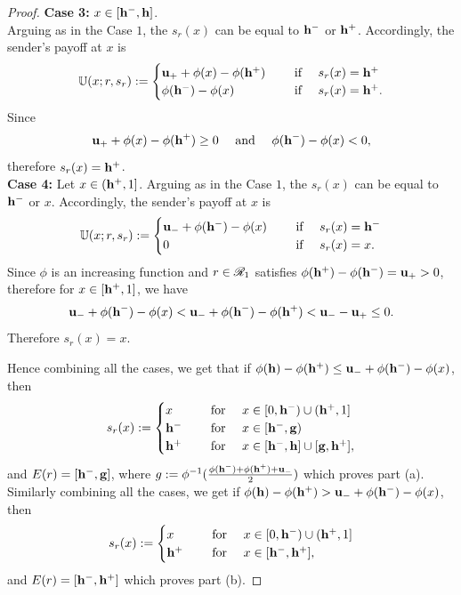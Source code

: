 \begin{proof}
\textbf{Case 3: }
		$x \in [\mathbf{h^{-}},\mathbf{h}]$.\\ Arguing as in the Case $1$, the $s_r(x)$ can be equal to $\mathbf{h^{-}}$ or $\mathbf{h^{+}}$.
		Accordingly, the sender's payoff at $x$ is
		\[\senpayoff(x;r,s_r) := \begin{cases}
			\up + \phi(x) - \phi(\jb)  & \text{ if } s_r(x) = \jb \\
			\phi(\ib) - \phi(x)& \text{ if }s_r(x) = \jb.\\
		\end{cases}\]
 Since $$\up + \phi(x) - \phi(\jb)  \geq 0 \text{ and } \phi(\ib) - \phi(x) <0,$$ therefore $s_r(x) = \mathbf{h^{+}}$. \\


\textbf{Case 4:}
		Let $x \in (\mathbf{h^{+}},1]$. Arguing as in the Case $1$, the $s_r(x)$ can be equal to $\mathbf{h^{-}}$ or $x$. Accordingly, the sender's payoff at $x$ is
			\[\senpayoff(x;r,s_r) := \begin{cases}
			\um + \phi(\ib) - \phi(x) & \text{ if } s_r(x) = \ib \\
			0& \text{ if }s_r(x) = x.\\
		\end{cases}\]
		Since $\phi$ is an increasing function and $r \in \mathscr{R}_1$ satisfies $\phi(\mathbf{h^{+}}) - \phi(\mathbf{h^{-}}) = \mathbf{u_+} > 0$, therefore for $x \in [\mathbf{h^{+}},1]$, we have
		\[\mathbf{u_-} + \phi(\mathbf{h^{-}}) - \phi(x) < \mathbf{u_-} + \phi(\mathbf{h^{-}}) - \phi(\mathbf{h^{+}}) < \mathbf{u_-} -\mathbf{u_+} \leq 0.\]
 		Therefore $s_r(x) = x$.

\noindent Hence combining all the cases, we get that if $\phi(\mathbf{h}) - \phi(\mathbf{h^{+}}) \leq  \mathbf{u_-} + \phi(\mathbf{h^{-}}) - \phi(x)$, then
\begin{equation*}
   s_r(x) := \begin{cases}
       x &\text{ for } x \in [0,\ib) \cup (\jb,1]\\
       \ib &\text{ for } x \in [\ib,\lb)\\
       \jb &\text{ for } x \in [\ib,\h] \cup [\lb,\jb],
   \end{cases}
\end{equation*}
and $E(r) = [\mathbf{h^{-}},\mathbf{g}]$, where $g := \phi^{-1}(\frac{\phi(\mathbf{h^{-}}) + \phi(\mathbf{h^{+}}) + \mathbf{u_-}}{2})$ which proves part (a).\\
\noindent Similarly combining all the cases, we get if $\phi(\mathbf{h}) - \phi(\mathbf{h^{+}}) > \mathbf{u_-} + \phi(\mathbf{h^{-}}) - \phi(x)$, then
\begin{equation*}
   s_r(x) := \begin{cases}
       x &\text{ for } x \in [0,\ib) \cup (\jb,1]\\
       \jb &\text{ for } x \in [\ib,\jb],
   \end{cases}
\end{equation*}
and $E(r) = [\mathbf{h^{-}},\mathbf{h^{+}}]$ which proves part (b).
\end{proof}

